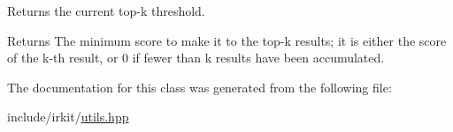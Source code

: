 Returns the current top-\/k threshold. 

\begin{DoxyReturn}{Returns}
The minimum score to make it to the top-\/k results; it is either the score of the k-\/th result, or 0 if fewer than k results have been accumulated. 
\end{DoxyReturn}


The documentation for this class was generated from the following file\+:\begin{DoxyCompactItemize}
\item 
include/irkit/\mbox{\hyperlink{utils_8hpp}{utils.\+hpp}}\end{DoxyCompactItemize}

